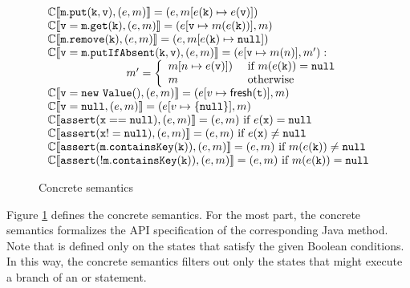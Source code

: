 \begin{figure}
	\footnotesize
	\[
	\begin{array}{l}
	\mathbb{C}\llbracket \mathtt{m.put(k, v)}, (e, m) \rrbracket = 
	(e, m[e(\mathtt{k}) \mapsto e(\mathtt{v})])\\
	\mathbb{C}\llbracket \mathtt{v=m.get(k)}, (e, m) \rrbracket = (e[\mathtt{v} \mapsto m(e(\mathtt{k}))], m) \\
	\mathbb{C}\llbracket \mathtt{m.remove(k)}, (e, m) \rrbracket = 
	(e, m[e(\mathtt{k}) \mapsto \mathtt{null}])\\
	\mathbb{C}\llbracket \mathtt{v = m.putIfAbsent(k, v)}, (e, m) \rrbracket =  (e[\mathtt{v} \mapsto m(n)], m') : \\
	\hspace{70pt} 
	m'=
	\left\{
	\begin{array}{ll}
	m[n \mapsto e(\mathtt{v})]) & \textrm{ if } m(e(\mathtt{k})) = \mathtt{null}\\
	m & \textrm{ otherwise}\\
	\end{array}
	\right. \\
	\mathbb{C}\llbracket \mathtt{v = new\ Value()}, (e, m) \rrbracket =  (e[v \mapsto \mathsf{fresh}(\mathtt{t})], m)\\
	\mathbb{C}\llbracket \mathtt{v = null}, (e, m) \rrbracket =  (e[v \mapsto \{\mathtt{null}\}], m)\\
	\mathbb{C}\llbracket \mathtt{assert(x==null)}, (e, m) \rrbracket = (e,m) \textrm{ if } e(\mathtt{x})=\mathtt{null}\\
	\mathbb{C}\llbracket \mathtt{assert(x!=null)}, (e, m) \rrbracket = (e,m ) \textrm{ if } e(\mathtt{x})\neq\mathtt{null}\\
	\mathbb{C}\llbracket \mathtt{assert(m.containsKey(k))}, (e, m) \rrbracket = (e, m) \textrm{ if } m(e(\mathtt{k})) \neq \mathtt{null}\\
	\mathbb{C}\llbracket \mathtt{assert(!m.containsKey(k))}, (e, m) \rrbracket =(e, m) \textrm{ if } m(e(\mathtt{k})) = \mathtt{null}\\
	\end{array}
	\]
	\caption{Concrete semantics}
	\label{fig:concretesemantics}
\end{figure}


Figure \ref{fig:concretesemantics} defines the concrete semantics. For the most part, the concrete semantics formalizes the API specification of the corresponding Java method. Note that  is defined only on the states that satisfy the given Boolean conditions. In this way, the concrete semantics filters out only the states that might execute a branch of an  or  statement.

